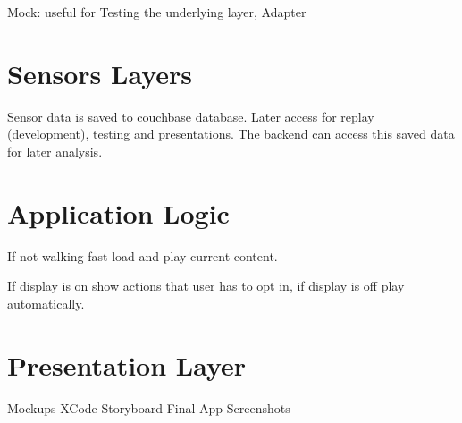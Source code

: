Mock: useful for Testing the underlying layer,
Adapter


\section{Sensors Layers}

Sensor data is saved to couchbase database.
Later access for replay (development), testing and presentations.
The backend can access this saved data for later analysis.

\section{Application Logic}

If not walking fast load and play current content.

If display is on show actions that user has to opt in, if display is off play automatically. 

\section{Presentation Layer}

Mockups
XCode Storyboard
Final App Screenshots